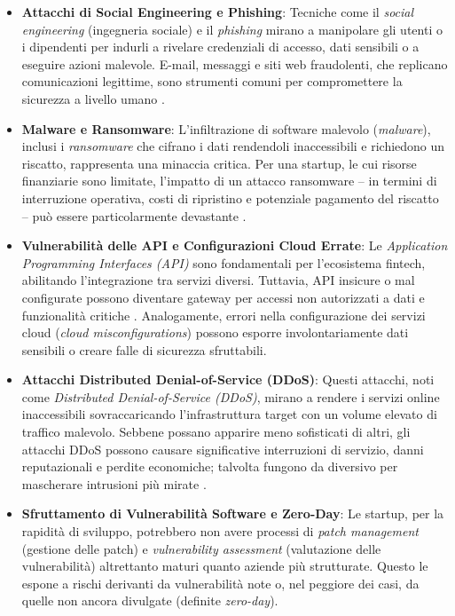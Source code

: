 \begin{itemize}
    \item \textbf{Attacchi di Social Engineering e Phishing}: Tecniche come il \textit{social engineering} (ingegneria sociale) e il \textit{phishing} mirano a manipolare gli utenti o i dipendenti per indurli a rivelare credenziali di accesso, dati sensibili o a eseguire azioni malevole. E-mail, messaggi e siti web fraudolenti, che replicano comunicazioni legittime, sono strumenti comuni per compromettere la sicurezza a livello umano \cite{cyberThreatsfintech}.
    
    \item \textbf{Malware e Ransomware}: L'infiltrazione di software malevolo (\textit{malware}), inclusi i \textit{ransomware} che cifrano i dati rendendoli inaccessibili e richiedono un riscatto, rappresenta una minaccia critica. Per una startup, le cui risorse finanziarie sono limitate, l'impatto di un attacco ransomware – in termini di interruzione operativa, costi di ripristino e potenziale pagamento del riscatto – può essere particolarmente devastante \cite{cyberThreatsfintech}.
    
    \item \textbf{Vulnerabilità delle API e Configurazioni Cloud Errate}: Le \textit{Application Programming Interfaces (API)} sono fondamentali per l'ecosistema fintech, abilitando l'integrazione tra servizi diversi. Tuttavia, API insicure o mal configurate possono diventare gateway per accessi non autorizzati a dati e funzionalità critiche \cite{fintechChallenges}. Analogamente, errori nella configurazione dei servizi cloud (\textit{cloud misconfigurations}) possono esporre involontariamente dati sensibili o creare falle di sicurezza sfruttabili.
    
    \item \textbf{Attacchi Distributed Denial-of-Service (DDoS)}: Questi attacchi, noti come \textit{Distributed Denial-of-Service (DDoS)}, mirano a rendere i servizi online inaccessibili sovraccaricando l'infrastruttura target con un volume elevato di traffico malevolo. Sebbene possano apparire meno sofisticati di altri, gli attacchi DDoS possono causare significative interruzioni di servizio, danni reputazionali e perdite economiche; talvolta fungono da diversivo per mascherare intrusioni più mirate \cite{fintechChallenges}.
    
    \item \textbf{Sfruttamento di Vulnerabilità Software e Zero-Day}: Le startup, per la rapidità di sviluppo, potrebbero non avere processi di \textit{patch management} (gestione delle patch) e \textit{vulnerability assessment} (valutazione delle vulnerabilità) altrettanto maturi quanto aziende più strutturate. Questo le espone a rischi derivanti da vulnerabilità note o, nel peggiore dei casi, da quelle non ancora divulgate (definite \textit{zero-day}).
\end{itemize}

